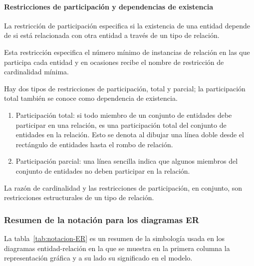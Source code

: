 \paragraph*{Restricciones de participación y dependencias de existencia}
La restricción de participación especifica si la existencia de una entidad depende de si está relacionada con otra entidad a través de un tipo de relación.


Esta restricción especifica el número mínimo de instancias de relación en las que participa cada entidad y en ocasiones recibe el nombre de restricción de cardinalidad mínima.


Hay dos tipos de restricciones de participación, total y parcial; la participación total también se conoce como dependencia de existencia.

\begin{enumerate}
    \item Participación total: si todo miembro de un conjunto de entidades debe participar en una relación, es una participación total del conjunto de entidades en la relación. Esto se denota al dibujar una línea doble desde el rectángulo de entidades hasta el rombo de relación.
    \item Participación parcial: una línea sencilla indica que algunos miembros del conjunto de entidades no deben participar en la relación.
    \end{enumerate}

La razón de cardinalidad y las restricciones de participación, en conjunto, son restricciones estructurales de un tipo de relación.





\subsubsection{Resumen de la notación para los diagramas ER}


La tabla~\ref{tab:notacion-ER} es un resumen de la simbología usada en los diagramas entidad-relación en la que se muestra en la primera columna la representación gráfica y a su lado su significado en el modelo.

